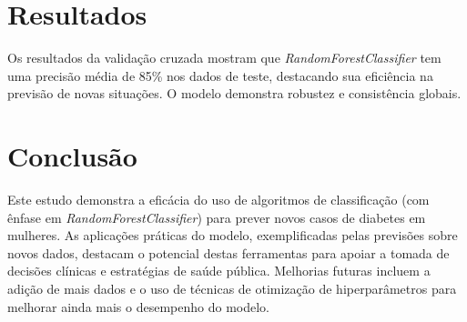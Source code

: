 \documentclass[a4paper,12pt]{article}
\begin{document}
\section{Resultados}

Os resultados da validação cruzada mostram que \textit{RandomForestClassifier} tem uma precisão média de 85\% nos dados de teste, destacando sua eficiência na previsão de novas situações. O modelo demonstra robustez e consistência globais.

\section{Conclusão}

Este estudo demonstra a eficácia do uso de algoritmos de classificação (com ênfase em \textit{RandomForestClassifier}) para prever novos casos de diabetes em mulheres. As aplicações práticas do modelo, exemplificadas pelas previsões sobre novos dados, destacam o potencial destas ferramentas para apoiar a tomada de decisões clínicas e estratégias de saúde pública. Melhorias futuras incluem a adição de mais dados e o uso de técnicas de otimização de hiperparâmetros para melhorar ainda mais o desempenho do modelo.
\end{document}
